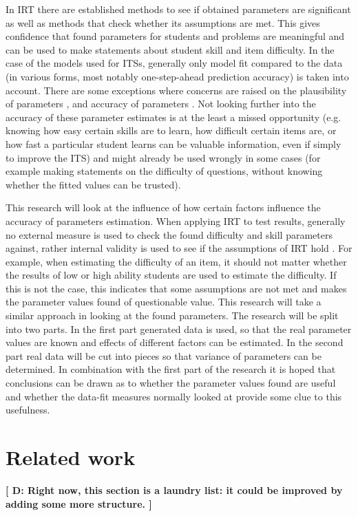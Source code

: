 \documentclass{scrartcl}
\providecommand{\comm}[1]{{\bf[ #1 ]}}
\providecommand{\commd}[1]{\comm{D: {#1}}}
\begin{document}
In IRT there are established methods to see if obtained parameters are significant as well as methods that check whether its assumptions are met. This gives confidence that found parameters for students and problems are meaningful and can be used to make statements about student skill and item difficulty. In the case of the models used for ITSs, generally only model fit compared to the data (in various forms, most notably one-step-ahead prediction accuracy) is taken into account. There are some exceptions where concerns are raised on the plausibility of parameters \cite{ktpfa}, \cite{knowledgeproblem} and accuracy of parameters \cite{blackart}. Not looking further into the accuracy of these parameter estimates is at the least a missed opportunity (e.g. knowing how easy certain skills are to learn, how difficult certain items are, or how fast a particular student learns can be valuable information, even if simply to improve the ITS) and might already be used wrongly in some cases (for example making statements on the difficulty of questions, without knowing whether the fitted values can be trusted).

This research will look at the influence of how certain factors influence the accuracy of parameters estimation. When applying IRT to test results, generally no external measure is used to check the found difficulty and skill parameters against, rather internal validity is used to see if the assumptions of IRT hold \cite{hambleton}. For example, when estimating the difficulty of an item, it should not matter whether the results of low or high ability students are used to estimate the difficulty. If this is not the case, this indicates that some assumptions are not met and makes the parameter values found of questionable value. This research will take a similar approach in looking at the found parameters. The research will be split into two parts. In the first part generated data is used, so that the real parameter values are known and effects of different factors can be estimated. In the second part real data will be cut into pieces so that variance of parameters can be determined. In combination with the first part of the research it is hoped that conclusions can be drawn as to whether the parameter values found are useful and whether the data-fit measures normally looked at provide some clue to this usefulness.

\section{Related work}
\commd{Right now, this section is a laundry list: it could be improved by adding some more structure.}
\end{document}
